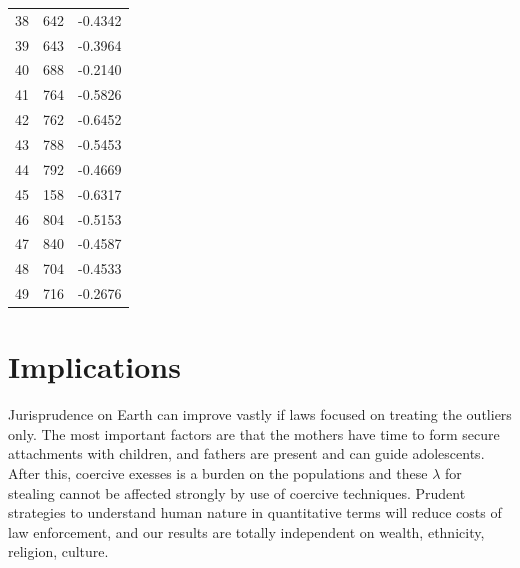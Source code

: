 \documentclass{amsart}
\begin{document}
\begin{longtable}{rrr}
  38 & 642 & -0.4342 \\ 
  39 & 643 & -0.3964 \\ 
  40 & 688 & -0.2140 \\ 
  41 & 764 & -0.5826 \\ 
  42 & 762 & -0.6452 \\ 
  43 & 788 & -0.5453 \\ 
  44 & 792 & -0.4669 \\ 
  45 & 158 & -0.6317 \\ 
  46 & 804 & -0.5153 \\ 
  47 & 840 & -0.4587 \\ 
  48 & 704 & -0.4533 \\ 
  49 & 716 & -0.2676 \\ 
   \hline
\hline
\end{longtable}

\section{Implications}
Jurisprudence on Earth can improve vastly if laws focused on treating the outliers only.  The most important factors are that the mothers have time to form secure attachments with children, and fathers are present and can guide adolescents.  After this, coercive exesses is a burden on the populations and these $\lambda$ for stealing cannot be affected strongly by use of coercive techniques.  Prudent strategies to understand human nature in quantitative terms will reduce costs of law enforcement, and our results are totally independent on wealth, ethnicity, religion, culture.
\end{document}
